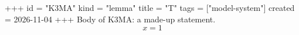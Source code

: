 +++
id = "K3MA"
kind = "lemma"
title = "T"
tags = ["model-system"]
created = 2026-11-04
+++
Body of K3MA: a made-up statement.
\begin{equation}\label{eq:here} x = 1 \end{equation}
